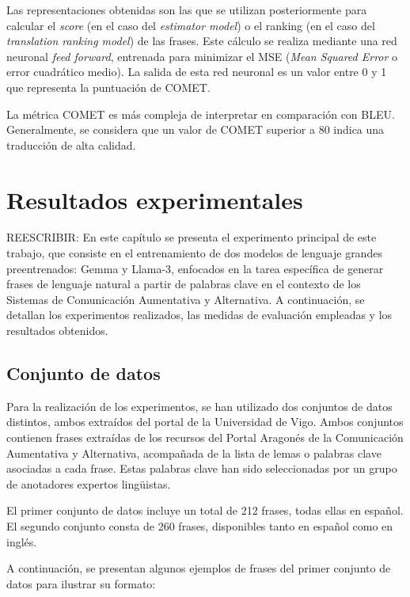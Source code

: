 \documentclass[11pt,spanish,listoffigures,listoftables]{tfgetsinf}
\begin{document}
Las representaciones obtenidas son las que se utilizan posteriormente para calcular el \textit{score} (en el caso del \textit{estimator model}) o el ranking (en el caso del \textit{translation ranking model}) de las frases. Este cálculo se realiza mediante una red neuronal \textit{feed forward}, entrenada para minimizar el MSE (\textit{Mean Squared Error} o error cuadrático medio). La salida de esta red neuronal es un valor entre 0 y 1 que representa la puntuación de COMET.

La métrica COMET es más compleja de interpretar en comparación con BLEU. Generalmente, se considera que un valor de COMET superior a 80 indica una traducción de alta calidad.

\chapter{Resultados experimentales} \label{cap4}

REESCRIBIR: En este capítulo se presenta el experimento principal de este trabajo, que consiste en el entrenamiento de dos modelos de lenguaje grandes preentrenados: Gemma y Llama-3, enfocados en la tarea específica de generar frases de lenguaje natural a partir de palabras clave en el contexto de los Sistemas de Comunicación Aumentativa y Alternativa. A continuación, se detallan los experimentos realizados, las medidas de evaluación empleadas y los resultados obtenidos.

\section{Conjunto de datos}

Para la realización de los experimentos, se han utilizado dos conjuntos de datos distintos, ambos extraídos del portal de la Universidad de Vigo. Ambos conjuntos contienen frases extraídas de los recursos del Portal Aragonés de la Comunicación Aumentativa y Alternativa, acompañada de la lista de lemas o palabras clave asociadas a cada frase. Estas palabras clave han sido seleccionadas por un grupo de anotadores expertos lingüistas.

El primer conjunto de datos incluye un total de 212 frases, todas ellas en español. El segundo conjunto consta de 260 frases, disponibles tanto en español como en inglés.

A continuación, se presentan algunos ejemplos de frases del primer conjunto de datos para ilustrar su formato:

\end{document}

